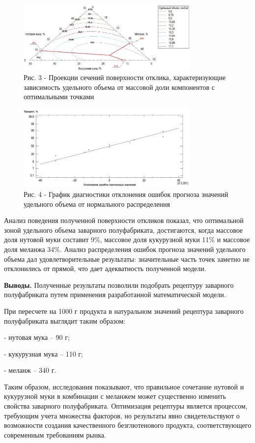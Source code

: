 \begin{figure}[H]
	\centering
	\includegraphics[width=0.8\textwidth]{media/pish/image3}
	\caption*{Рис. 3 - Проекции сечений поверхности отклика, характеризующие
зависимость удельного объема от массовой доли компонентов с оптимальными
точками}
\end{figure}

\begin{figure}[H]
	\centering
	\includegraphics[width=0.8\textwidth]{media/pish/image4}
	\caption*{Рис. 4 - График диагностики отклонения ошибок прогноза значений удельного объема от нормального распределения}
\end{figure}

\begin{multicols}{2}
Анализ поведения полученной поверхности откликов показал, что
оптимальной зоной удельного объема заварного полуфабриката, достигаются,
когда массовое доля нутовой муки составит 9\%, массовое доля кукурузной
муки 11\% и массовое доля меланжа 34\%. Анализ распределения ошибок
прогноза значений удельного объема дал удовлетворительные результаты:
значительные часть точек заметно не отклонились от прямой, что дает
адекватность полученной модели.

{\bfseries Выводы.} Полученные результаты позволили подобрать рецептуру
заварного полуфабриката путем применения разработанной математической
модели.

При пересчете на 1000 г продукта в натуральном значений рецептура
заварного полуфабриката выглядит таким образом:

- нутовая мука -- 90 г;

- кукурузная мука -- 110 г;

- меланж -- 340 г.

Таким образом, исследования показывают, что правильное сочетание нутовой
и кукурузной муки в комбинации с меланжем может существенно изменить
свойства заварного полуфабриката. Оптимизация рецептуры является
процессом, требующим учета множества факторов, но результаты явно
свидетельствуют о возможности создания качественного безглютенового
продукта, соответствующего современным требованиям рынка.
\end{multicols}

